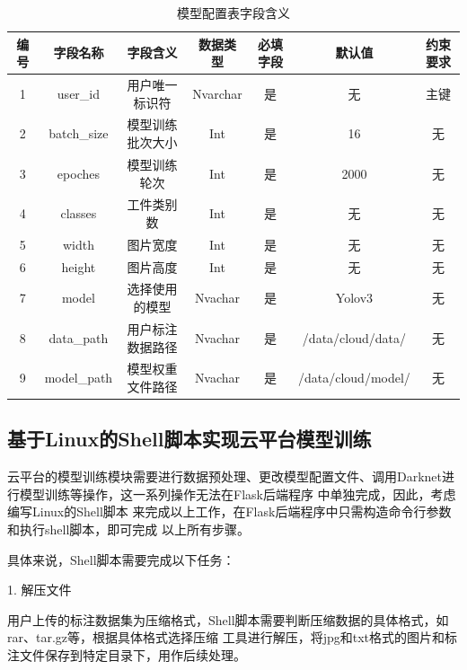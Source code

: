 {
    \begin{table}[htb] 
        \caption{模型配置表字段含义}
        \label{table:database:modelInfo}
        \centering
        \begin{tabular}[t]{c|c|c|c|c|c|c}
            \hline
            编号 & 字段名称 & 字段含义 & 数据类型 & 必填字段 & 默认值 & 约束要求  \\
            \hline
            1 & user\_id & 用户唯一标识符 & Nvarchar & 是 & 无 & 主键\\
            \hline
            2 & batch\_size & 模型训练批次大小 & Int & 是 & 16 & 无 \\
            \hline
            3 & epoches & 模型训练轮次 & Int & 是 & 2000 & 无\\
            \hline
            4 & classes & 工件类别数 & Int & 是 & 无 & 无\\
            \hline
            5 & width & 图片宽度 & Int & 是 & 无 & 无\\
            \hline
            6 & height & 图片高度 & Int & 是 & 无 & 无 \\
            \hline
            7 & model & 选择使用的模型 & Nvachar & 是 & Yolov3 & 无 \\
            \hline
            8 & data\_path & 用户标注数据路径 & Nvachar & 是 & /data/cloud/data/ & 无 \\
            \hline
            9 & model\_path & 模型权重文件路径 & Nvachar & 是 & /data/cloud/model/ & 无 \\
            \hline
        \end{tabular}
    \end{table}
}

\subsection{基于Linux的Shell脚本实现云平台模型训练}

云平台的模型训练模块需要进行数据预处理、更改模型配置文件、调用Darknet进行模型训练等操作，这一系列操作无法在Flask后端程序
中单独完成，因此，考虑编写Linux的Shell脚本 \cite{Shell} 来完成以上工作，在Flask后端程序中只需构造命令行参数和执行shell脚本，即可完成
以上所有步骤。

具体来说，Shell脚本需要完成以下任务：

1. 解压文件

用户上传的标注数据集为压缩格式，Shell脚本需要判断压缩数据的具体格式，如rar、tar.gz等，根据具体格式选择压缩
工具进行解压，将jpg和txt格式的图片和标注文件保存到特定目录下，用作后续处理。

